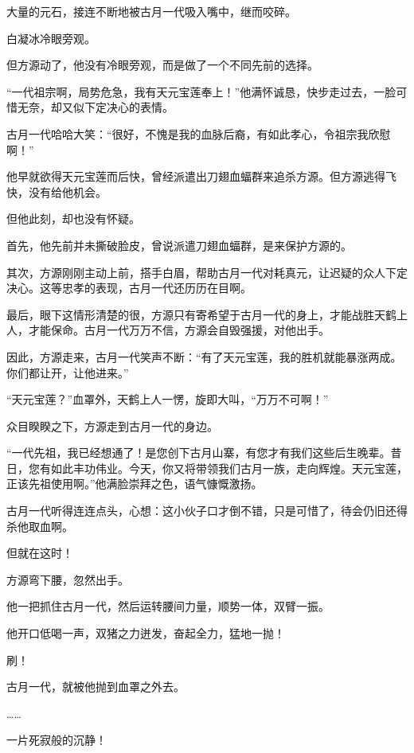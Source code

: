 
\begin{this_body}



大量的元石，接连不断地被古月一代吸入嘴中，继而咬碎。

白凝冰冷眼旁观。

但方源动了，他没有冷眼旁观，而是做了一个不同先前的选择。

“一代祖宗啊，局势危急，我有天元宝莲奉上！”他满怀诚恳，快步走过去，一脸可惜无奈，却又似下定决心的表情。

古月一代哈哈大笑：“很好，不愧是我的血脉后裔，有如此孝心，令祖宗我欣慰啊！”

他早就欲得天元宝莲而后快，曾经派遣出刀翅血蝠群来追杀方源。但方源逃得飞快，没有给他机会。

但他此刻，却也没有怀疑。

首先，他先前并未撕破脸皮，曾说派遣刀翅血蝠群，是来保护方源的。

其次，方源刚刚主动上前，搭手白眉，帮助古月一代对耗真元，让迟疑的众人下定决心。这等忠孝的表现，古月一代还历历在目啊。

最后，眼下这情形清楚的很，方源只有寄希望于古月一代的身上，才能战胜天鹤上人，才能保命。古月一代万万不信，方源会自毁强援，对他出手。

因此，方源走来，古月一代笑声不断：“有了天元宝莲，我的胜机就能暴涨两成。你们都让开，让他进来。”

“天元宝莲？”血罩外，天鹤上人一愣，旋即大叫，“万万不可啊！”

众目睽睽之下，方源走到古月一代的身边。

“一代先祖，我已经想通了！是您创下古月山寨，有您才有我们这些后生晚辈。昔日，您有如此丰功伟业。今天，你又将带领我们古月一族，走向辉煌。天元宝莲，正该先祖使用啊。”他满脸崇拜之色，语气慷慨激扬。

古月一代听得连连点头，心想：这小伙子口才倒不错，只是可惜了，待会仍旧还得杀他取血啊。

但就在这时！

方源弯下腰，忽然出手。

他一把抓住古月一代，然后运转腰间力量，顺势一体，双臂一振。

他开口低喝一声，双猪之力迸发，奋起全力，猛地一抛！

刷！

古月一代，就被他抛到血罩之外去。

……

一片死寂般的沉静！


\end{this_body}
